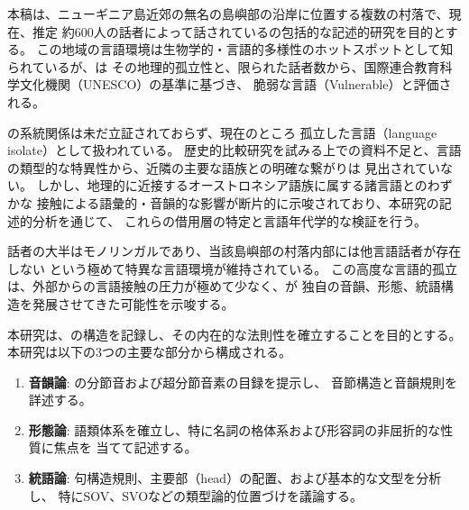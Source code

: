 \label{sec:introduction}

本稿は、ニューギニア島近郊の無名の島嶼部の沿岸に位置する複数の村落で、現在、推定
約600人の話者によって話されている\langname の包括的な記述的研究を目的とする。
この地域の言語環境は生物学的・言語的多様性のホットスポットとして知られているが、\langname は
その地理的孤立性と、限られた話者数から、国際連合教育科学文化機関（UNESCO）の基準に基づき、
脆弱な言語（Vulnerable）と評価される。

\langname の系統関係は未だ立証されておらず、現在のところ
孤立した言語（language isolate）として扱われている。
歴史的比較研究を試みる上での資料不足と、言語の類型的な特異性から、近隣の主要な語族との明確な繋がりは
見出されていない。
しかし、地理的に近接するオーストロネシア語族に属する諸言語とのわずかな
接触による語彙的・音韻的な影響が断片的に示唆されており、本研究の記述的分析を通じて、
これらの借用層の特定と言語年代学的な検証を行う。

\langname 話者の大半はモノリンガルであり、当該島嶼部の村落内部には他言語話者が存在しない
という極めて特異な言語環境が維持されている。
この高度な言語的孤立は、外部からの言語接触の圧力が極めて少なく、\langname が
独自の音韻、形態、統語構造を発展させてきた可能性を示唆する。

本研究は、\langname の構造を記録し、その内在的な法則性を確立することを目的とする。
本研究は以下の3つの主要な部分から構成される。

\begin{enumerate}
    \item \textbf{音韻論}: \langname の分節音および超分節音素の目録を提示し、
    音節構造と音韻規則を詳述する。
    \item \textbf{形態論}: 語類体系を確立し、特に名詞の格体系および形容詞の非屈折的な性質に焦点を
    当てて記述する。
    \item \textbf{統語論}: 句構造規則、主要部（head）の配置、および基本的な文型を分析し、
    特にSOV、SVOなどの類型論的位置づけを議論する。
\end{enumerate}